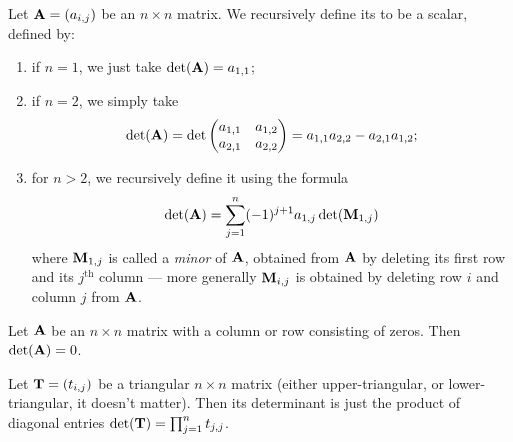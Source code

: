\begin{definition}
Let $\mathbf{A}=(a_{i,j})$ be an $n\times n$ matrix.
We recursively define its  to be a scalar, defined by:
\begin{enumerate}
\item if $n=1$, we just take $\det(\mathbf{A})=a_{1,1}$;
\item if $n=2$, we simply take
  \begin{equation}
    \det(\mathbf{A}) = \det\begin{pmatrix}a_{1,1} & a_{1,2}\\
    a_{2,1} & a_{2,2}
    \end{pmatrix} = a_{1,1}a_{2,2} - a_{2,1}a_{1,2};
  \end{equation}
\item for $n>2$, we recursively define it using the formula
  \begin{equation}
\det(\mathbf{A}) = \sum_{j=1}^{n}(-1)^{j+1}a_{1,j}\det(\mathbf{M}_{1,j})
  \end{equation}
  where $\mathbf{M}_{1,j}$ is called a \emph{minor} of $\mathbf{A}$, obtained
  from $\mathbf{A}$ by deleting its first row and its $j^{\text{th}}$
  column --- more generally $\mathbf{M}_{i,j}$ is obtained by deleting row
  $i$ and column $j$ from $\mathbf{A}$.
\end{enumerate}
\end{definition}

\begin{lemma}
Let $\mathbf{A}$ be an $n\times n$ matrix with a column or row consisting of
zeros. Then $\det(\mathbf{A})=0$.
\end{lemma}

\begin{theorem}
Let $\mathbf{T}=(t_{i,j})$ be a triangular $n\times n$ matrix (either
upper-triangular, or lower-triangular, it doesn't matter).
Then its determinant is just the product of diagonal entries
$\det(\mathbf{T}) = \prod_{j=1}^{n}t_{j,j}$.
\end{theorem}

